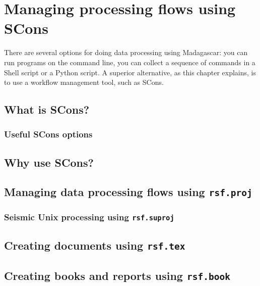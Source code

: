 \chapter{Managing processing flows using SCons}

There are several options for doing data processing using Madagascar:
you can run programs on the command line, you can collect a sequence
of commands in a Shell script or a Python script. A superior
alternative, as this chapter explains, is to use a workflow management
tool, such as SCons.

\section{What is SCons?}

\subsection{Useful SCons options}

\section{Why use SCons?}

\section{Managing data processing flows using \texttt{rsf.proj}}

\subsection{Seismic Unix processing using  \texttt{rsf.suproj}}

\section{Creating documents using \texttt{rsf.tex}}

\section{Creating books and reports using \texttt{rsf.book}}

